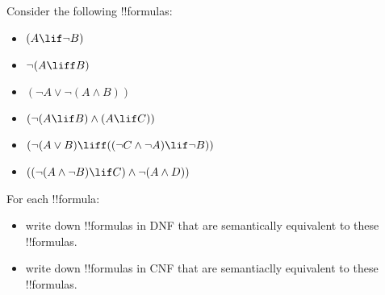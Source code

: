 \documentclass[../../../include/open-logic-section]{subfiles}
\begin{document}
\begin{prob}
Consider the following !!{formula}s:
	\begin{itemize}
		\item $(A \lif \lnot B)$
		\item $\lnot (A \liff B)$
		\item $(\lnot A \lor \lnot (A \land B))$
		\item $(\lnot (A \lif B ) \land (A \lif C))$
		\item $(\lnot (A \lor B) \liff ((\lnot C \land \lnot A) \lif \lnot B))$
		\item $((\lnot (A \land \lnot B) \lif C) \land \lnot (A \land D))$
	\end{itemize}
For each !!{formula}:
	\begin{itemize}
		\item write down !!{formula}s in DNF that are semantically equivalent to these !!{formula}s.
		\item write down !!{formula}s in CNF that are semantiaclly equivalent to these !!{formula}s. 
	\end{itemize}
\end{prob}
\end{document}
